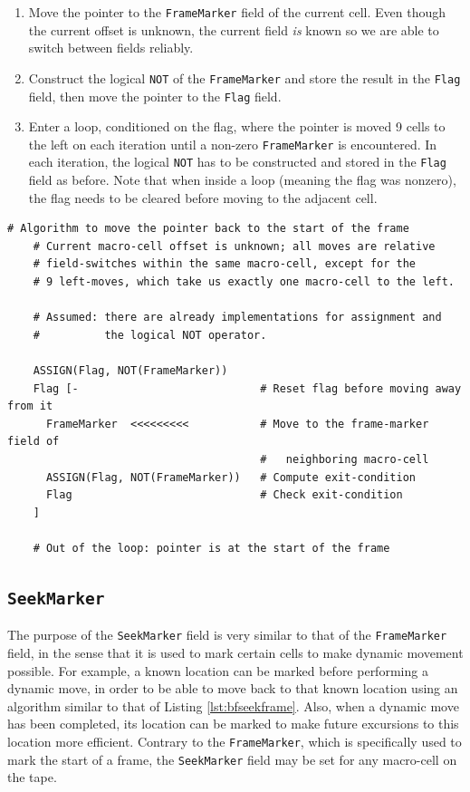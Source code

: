 \begin{enumerate}
\item Move the pointer to the \texttt{FrameMarker} field of the current cell. Even though the current offset is unknown, the current field \emph{is} known so we are able to switch between fields reliably.
\item Construct the logical \texttt{NOT} of the \texttt{FrameMarker} and store the result in the \texttt{Flag} field, then move the pointer to the \texttt{Flag} field.
\item Enter a loop, conditioned on the flag, where the pointer is moved 9 cells to the left on each iteration until a non-zero \texttt{FrameMarker} is encountered. In each iteration, the logical \texttt{NOT} has to be constructed and stored in the \texttt{Flag} field as before. Note that when inside a loop (meaning the flag was nonzero), the flag needs to be cleared before moving to the adjacent cell.
\end{enumerate}


\begin{lstfloat}[H]
  \begin{lstlisting}[style=brainfuck]
    # Algorithm to move the pointer back to the start of the frame
    # Current macro-cell offset is unknown; all moves are relative
    # field-switches within the same macro-cell, except for the
    # 9 left-moves, which take us exactly one macro-cell to the left.

    # Assumed: there are already implementations for assignment and
    #          the logical NOT operator.
    
    ASSIGN(Flag, NOT(FrameMarker))
    Flag [-                            # Reset flag before moving away from it
      FrameMarker  <<<<<<<<<           # Move to the frame-marker field of
                                       #   neighboring macro-cell
      ASSIGN(Flag, NOT(FrameMarker))   # Compute exit-condition
      Flag                             # Check exit-condition
    ]

    # Out of the loop: pointer is at the start of the frame
  \end{lstlisting}
  \caption{Algorithm to seek left to the start of the current frame from an unknown initial position.}
  \label{lst:bfseekframe}
\end{lstfloat}

\subsection{\texttt{SeekMarker}}
\label{sec:compilation:seekmarker}
The purpose of the \texttt{SeekMarker} field is very similar to that of the \texttt{FrameMarker} field, in the sense that it is used to mark certain cells to make dynamic movement possible. For example, a known location can be marked before performing a dynamic move, in order to be able to move back to that known location using an algorithm similar to that of Listing \ref{lst:bfseekframe}. Also, when a dynamic move has been completed, its location can be marked to make future excursions to this location more efficient. Contrary to the \texttt{FrameMarker}, which is specifically used to mark the start of a frame, the \texttt{SeekMarker} field may be set for any macro-cell on the tape.

